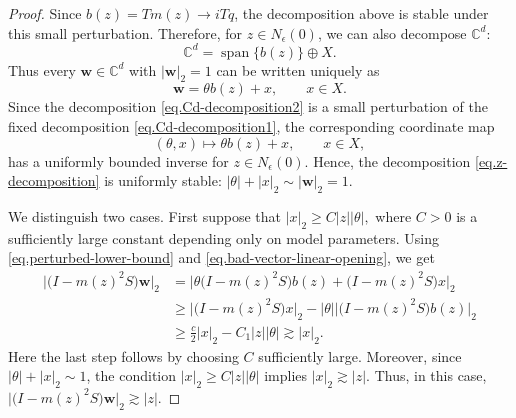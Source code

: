 \documentclass[11pt,twoside, a4paper]{article}
\numberwithin{equation}{section}
\numberwithin{figure}{section}
\theoremstyle{plain} %
\theoremstyle{definition}
\theoremstyle{remark}
\newcommand{\1} {\mspace{1 mu}}
\newcommand{\2} {\mspace{2 mu}}
\newcommand{\C} {{\mathbb{C}}}
\begin{document}
\begin{proof}
    Since \(b(z)=Tm(z)\to iTq\), the decomposition above is stable under this
    small perturbation. Therefore, for \(z\in N_\epsilon(0)\), we can also decompose $\C^d$:
    \begin{equation}\label{eq.Cd-decomposition2}
      \mathbb C^d=\operatorname{span}\{b(z)\}\oplus X .
    \end{equation}
    Thus every \(\mathbf{w}\in\mathbb C^d\) with $|\mathbf{w}|_2=1$ can be written uniquely as
    \begin{equation}\label{eq.z-decomposition}
      \mathbf{w}=\theta b(z)+x,\qquad x\in X.
    \end{equation}
    Since the decomposition \eqref{eq.Cd-decomposition2} is a small perturbation of the fixed decomposition \eqref{eq.Cd-decomposition1}, the corresponding coordinate map
    \[
        (\theta,x)\mapsto \theta b(z)+x,\qquad x\in X,
    \]
    has a uniformly bounded inverse for \(z\in N_\epsilon(0)\). Hence, the decomposition \eqref{eq.z-decomposition} is uniformly stable:
    $
        |\theta|+|x|_2\sim |\mathbf{w}|_2=1 .
    $

    We distinguish two cases. First suppose that
    $
        |x|_2\ge C|z||\theta|,
    $
    where \(C>0\) is a sufficiently large constant depending only on model parameters. Using
    \eqref{eq.perturbed-lower-bound} and \eqref{eq.bad-vector-linear-opening}, we get
    \[
    \begin{aligned}
       \big|\big(I-m(z)^2S\big)\mathbf{w}\big|_2
        &=
        \big|
            \theta\big(I-m(z)^2S\big)b(z)
            +
            \big(I-m(z)^2S\big)x
        \big|_2                                    \\
        &\ge
        \big|\big(I-m(z)^2S\big)x\big|_2
        -
        |\theta|
        \big|\big(I-m(z)^2S\big)b(z)\big|_2       \\
        &\ge
        \frac c2|x|_2-C_1|z||\theta|            
        \gtrsim
        |x|_2.
    \end{aligned}
    \]
    Here the last step follows by choosing \(C\) sufficiently large. Moreover,
    since \(|\theta|+|x|_2\sim1\), the condition
    \(|x|_2\ge C|z||\theta|\) implies
    $
        |x|_2\gtrsim |z|.
    $
    Thus, in this case,
    $
        \big|\big(I-m(z)^2S\big)\mathbf{w}\big|_2\gtrsim |z|.
    $


\end{proof}
\end{document}
